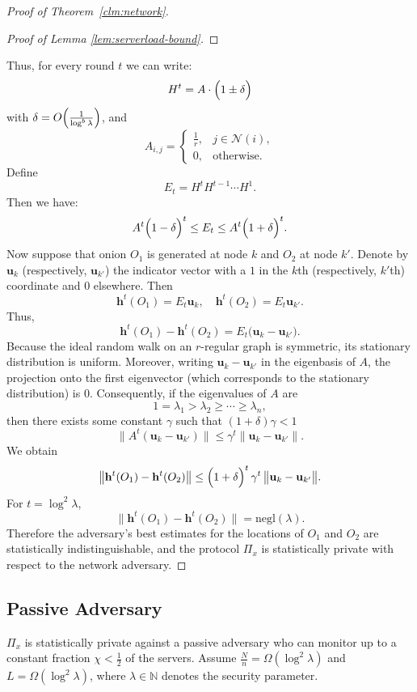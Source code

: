 \begin{proof} [Proof of Theorem~\ref{clm:network}]
\begin{proof}[Proof of Lemma \ref{lem:serverload-bound}]
\end{proof}
Thus, for every round $t$ we can write:
$$
H^t = A \cdot \Bigl(1 \pm \delta\Bigr)
$$
with $\delta = O\Bigl(\frac{1}{\log^{b} \lambda}\Bigr)$, and 
$$
A_{i,j} = \begin{cases}
\frac{1}{r}, & j \in \mathcal{N}(i),\\[1mm]
0, & \text{otherwise.}
\end{cases}
$$
Define
$$
E_t = H^t H^{t-1} \cdots H^1.
$$
Then we have:
$$
A^t \Bigl(1 - \delta\Bigr)^t \le E_t \le A^t \Bigl(1 + \delta\Bigr)^t.
$$
Now suppose that onion $O_1$ is generated at node $k$ and $O_2$ at node $k'$. Denote by $\mathbf{u}_k$ (respectively, $\mathbf{u}_{k'}$) the indicator vector with a $1$ in the $k$th (respectively, $k'$th) coordinate and $0$ elsewhere. Then
$$
\mathbf{h}^t(O_1) = E_t \mathbf{u}_k,\quad \mathbf{h}^t(O_2) = E_t \mathbf{u}_{k'}.
$$
Thus,
$$
\mathbf{h}^t(O_1) - \mathbf{h}^t(O_2) = E_t \bigl( \mathbf{u}_k - \mathbf{u}_{k'} \bigr).
$$
Because the ideal random walk on an $r$-regular graph is symmetric, its stationary distribution is uniform. Moreover, writing $\mathbf{u}_k - \mathbf{u}_{k'}$ in the eigenbasis of $A$, the projection onto the first eigenvector (which corresponds to the stationary distribution) is 0. Consequently, if the eigenvalues of $A$ are
$$
1 = \lambda_1 > \lambda_2 \ge \cdots \ge \lambda_n,
$$
then there exists some constant $\gamma$ such that $(1 + \delta)\gamma < 1$
$$
\bigl\| A^t (\mathbf{u}_k - \mathbf{u}_{k'}) \bigr\| \le \gamma^t \bigl\| \mathbf{u}_k - \mathbf{u}_{k'} \bigr\|.
$$
We obtain
$$
\bigl\| \mathbf{h}^t(O_1) - \mathbf{h}^t(O_2) \bigr\| \le \Bigl(1 + \delta\Bigr)^t\, \gamma^t\, \bigl\| \mathbf{u}_k - \mathbf{u}_{k'} \bigr\|.
$$
For $t = \log^2 \lambda$, 
$$
\bigl\| \mathbf{h}^t(O_1) - \mathbf{h}^t(O_2) \bigr\| = \text{negl}(\lambda).
$$
Therefore the adversary’s best estimates for the locations of $O_1$ and $O_2$ are statistically indistinguishable, and the protocol $\Pi_x$ is statistically private with respect to the network adversary.

\end{proof}



\clearpage

\subsection{Passive Adversary}

\begin{theorem} \label{clm:passive}
    $\Pi_x$ is statistically private against a passive adversary who can monitor up to a constant fraction $\chi < \frac{1}{2}$ of the servers. Assume $\frac{N}{n} = \Omega(\log^2 \lambda)$ and $L = \Omega(\log^2 \lambda)$, where $\lambda \in \mathbb{N}$ denotes the security parameter.\\
\end{theorem}

